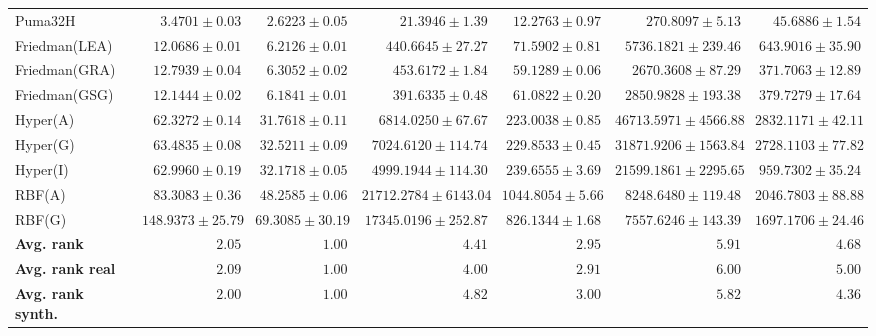 \begin{table*}[!htbp]
{\begin{tabular}{lrrrrrr}
		Puma32H & $3.4701 \pm 0.03$ & $\mathbf{2.6223 \pm 0.05}$ & $21.3946 \pm 1.39$ & $12.2763 \pm 0.97$ & $270.8097 \pm 5.13$ & $45.6886 \pm 1.54$\\
		Friedman(LEA) & $12.0686 \pm 0.01$ & $\mathbf{6.2126 \pm 0.01}$ & $440.6645 \pm 27.27$ & $71.5902 \pm 0.81$ & $5736.1821 \pm 239.46$ & $643.9016 \pm 35.90$\\
		Friedman(GRA) & $12.7939 \pm 0.04$ & $\mathbf{6.3052 \pm 0.02}$ & $453.6172 \pm 1.84$ & $59.1289 \pm 0.06$ & $2670.3608 \pm 87.29$ & $371.7063 \pm 12.89$\\
		Friedman(GSG) & $12.1444 \pm 0.02$ & $\mathbf{6.1841 \pm 0.01}$ & $391.6335 \pm 0.48$ & $61.0822 \pm 0.20$ & $2850.9828 \pm 193.38$ & $379.7279 \pm 17.64$\\
		Hyper(A) & $62.3272 \pm 0.14$ & $\mathbf{31.7618 \pm 0.11}$ & $6814.0250 \pm 67.67$ & $223.0038 \pm 0.85$ & $46713.5971 \pm 4566.88$ & $2832.1171 \pm 42.11$\\
		Hyper(G) & $63.4835 \pm 0.08$ & $\mathbf{32.5211 \pm 0.09}$ & $7024.6120 \pm 114.74$ & $229.8533 \pm 0.45$ & $31871.9206 \pm 1563.84$ & $2728.1103 \pm 77.82$\\
		Hyper(I) & $62.9960 \pm 0.19$ & $\mathbf{32.1718 \pm 0.05}$ & $4999.1944 \pm 114.30$ & $239.6555 \pm 3.69$ & $21599.1861 \pm 2295.65$ & $959.7302 \pm 35.24$\\
		RBF(A) & $83.3083 \pm 0.36$ & $\mathbf{48.2585 \pm 0.06}$ & $21712.2784 \pm 6143.04$ & $1044.8054 \pm 5.66$ & $8248.6480 \pm 119.48$ & $2046.7803 \pm 88.88$\\
		RBF(G) & $148.9373 \pm 25.79$ & $\mathbf{69.3085 \pm 30.19}$ & $17345.0196 \pm 252.87$ & $826.1344 \pm 1.68$ & $7557.6246 \pm 143.39$ & $1697.1706 \pm 24.46$\\
		\midrule
		\textbf{{Avg. rank}} & $2.05$ & $\mathbf{1.00}$ & $4.41$ & $2.95$ & $5.91$ & $4.68$\\
		\textbf{{Avg. rank real}} & $2.09$ & $\mathbf{1.00}$ & $4.00$ & $2.91$ & $6.00$ & $5.00$\\
		\textbf{{Avg. rank synth.}} & $2.00$ & $\mathbf{1.00}$ & $4.82$ & $3.00$ & $5.82$ & $4.36$\\
		\bottomrule
	\end{tabular}}
\end{table*}
